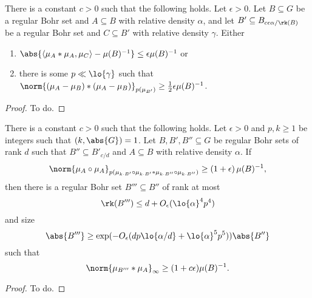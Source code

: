 \begin{proposition}\label{holder-lifting}
There is a constant $c>0$ such that the following holds. Let $\epsilon >0$. Let $B \subseteq G$ be a regular Bohr set and $A\subseteq B$ with relative density $\alpha$, and let $B' \subseteq B_{c\epsilon\alpha/\rk(B)}$ be a regular Bohr set and $C\subseteq B'$ with relative density $\gamma$. Either
\begin{enumerate}
\item $\abs{ \langle \mu_A*\mu_A, \mu_{C} \rangle - \mu(B)^{-1} } \leq \epsilon \mu(B)^{-1}$ or
\item there is some $p \ll\lo{\gamma}$ such that $\norm{ (\mu_A-\mu_B)*(\mu_A-\mu_B)}_{p(\mu_{B'})} \geq \tfrac{1}{2}\epsilon \mu(B)^{-1}$.
\end{enumerate}
\end{proposition}
\begin{proof}
To do.
\end{proof}

\begin{proposition}\label{prop-it}
There is a constant $c>0$ such that the following holds. Let $\epsilon>0$ and $p,k\geq 1$ be integers such that $(k,\abs{G})=1$. Let $B,B',B''\subseteq G$ be regular Bohr sets of rank $d$ such that $B''\subseteq B'_{c/d}$ and $A\subseteq B$ with relative density $\alpha$. If
    \[ \norm{ \mu_{A}\circ \mu_{A}}_{p(\mu_{k\cdot B'}\circ\mu_{k\cdot B'}\ast \mu_{k\cdot B''}\circ \mu_{k\cdot B''})} \geq \left(1+\epsilon\right) \mu(B)^{-1},\]
    then there is a regular Bohr set $B'''\subseteq B''$ of rank at most
    \[\rk(B''')\leq d+O_{\epsilon}(\lo{\alpha}^4p^4)\]
    and size
    \[\abs{B'''}\geq \exp(-O_{\epsilon}(dp\lo{\alpha/d}+\lo{\alpha}^5p^5))\abs{B''}\]
    such that
    \[ \norm{ \mu_{B'''}*\mu_A }_\infty \geq (1+c\epsilon)\mu(B)^{-1}. \]
\end{proposition}
\begin{proof}
To do.
\end{proof}

